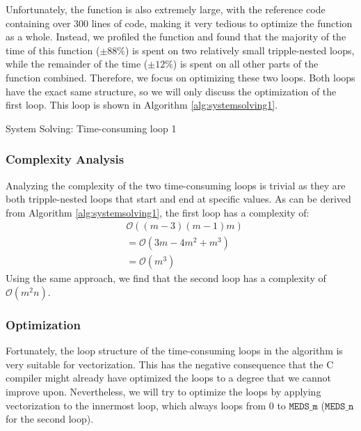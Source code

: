 \documentclass[11pt,a4paper]{report}
\theoremstyle{definition}
\begin{document}
Unfortunately, the function is also extremely large, with the reference code containing over 300 lines of code, making it very tedious to optimize the function as a whole. Instead, we profiled the function and found that the majority of the time of this function ($\pm 88 \%$) is spent on two relatively small tripple-nested loops, while the remainder of the time ($\pm 12 \%$) is spent on all other parts of the function combined. Therefore, we focus on optimizing these two loops. Both loops have the exact same structure, so we will only discuss the optimization of the first loop. This loop is shown in Algorithm \ref{alg:systemsolving1}.

\begin{algorithm}
  \caption{System Solving: Time-consuming loop 1}
  \label{alg:systemsolving1}
  
\end{algorithm}

\subsubsection{Complexity Analysis}
\label{sec:systemsolvingcomplexity}
Analyzing the complexity of the two time-consuming loops is trivial as they are both tripple-nested loops that start and end at specific values. As can be derived from Algorithm \ref{alg:systemsolving1}, the first loop has a complexity of:
\begin{align*}
  & \mathcal{O}((m-3)(m-1)m) \\
  & = \mathcal{O}(3m - 4m^2 + m^3) \\
  & = \mathcal{O}(m^3)
\end{align*}
Using the same approach, we find that the second loop has a complexity of $\mathcal{O}(m^2n)$.

\subsubsection{Optimization}
\label{sec:systemsolvingoptimization}
Fortunately, the loop structure of the time-consuming loops in the algorithm is very suitable for vectorization. This has the negative consequence that the C compiler might already have optimized the loops to a degree that we cannot improve upon. Nevertheless, we will try to optimize the loops by applying vectorization to the innermost loop, which always loops from $0$ to $\texttt{MEDS\_m}$ ($\texttt{MEDS\_n}$ for the second loop).
\end{document}
